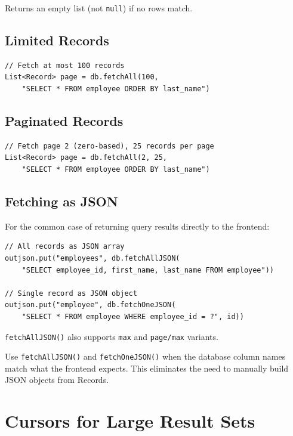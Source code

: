 \noindent
Returns an empty list (not \texttt{null}) if no rows match.

\subsection{Limited Records}

\begin{lstlisting}[style=groovy]
// Fetch at most 100 records
List<Record> page = db.fetchAll(100,
    "SELECT * FROM employee ORDER BY last_name")
\end{lstlisting}

\subsection{Paginated Records}

\begin{lstlisting}[style=groovy]
// Fetch page 2 (zero-based), 25 records per page
List<Record> page = db.fetchAll(2, 25,
    "SELECT * FROM employee ORDER BY last_name")
\end{lstlisting}

\subsection{Fetching as JSON}

For the common case of returning query results directly to the frontend:

\begin{lstlisting}[style=groovy]
// All records as JSON array
outjson.put("employees", db.fetchAllJSON(
    "SELECT employee_id, first_name, last_name FROM employee"))

// Single record as JSON object
outjson.put("employee", db.fetchOneJSON(
    "SELECT * FROM employee WHERE employee_id = ?", id))
\end{lstlisting}

\noindent
\texttt{fetchAllJSON()} also supports \texttt{max} and \texttt{page/max} variants.

\begin{tipbox}
Use \texttt{fetchAllJSON()} and \texttt{fetchOneJSON()} when the database column names match what the frontend expects.  This eliminates the need to manually build JSON objects from Records.
\end{tipbox}

\section{Cursors for Large Result Sets}
\label{sec:db-cursor}

